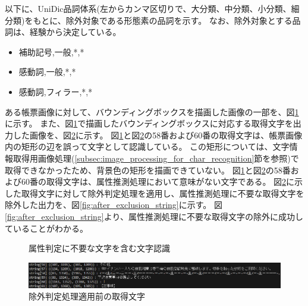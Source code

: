 以下に、UniDic品詞体系(左からカンマ区切りで、大分類、中分類、小分類、細分類)をもとに、除外対象である形態素の品詞を示す。
なお、除外対象とする品詞は、経験から決定している。

\begin{itemize}
    \item 補助記号,一般,*,*
    \item 感動詞,一般,*,*
    \item 感動詞,フィラー,*,*
\end{itemize}

ある帳票画像に対して、バウンディングボックスを描画した画像の一部を、図\ref{fig:before_exclusion_bbox}に示す。
また、図\ref{fig:before_exclusion_bbox}で描画したバウンディングボックスに対応する取得文字を出力した画像を、図\ref{fig:before_exclusion_string}に示す。
図\ref{fig:before_exclusion_bbox}と図\ref{fig:before_exclusion_string}の58番および60番の取得文字は、帳票画像内の矩形の辺を誤って文字として認識している。
この矩形については、文字情報取得用画像処理(\ref{subsec:image_processing_for_char_recognition}節を参照)で取得できなかったため、背景色の矩形を描画できていない。
図\ref{fig:before_exclusion_bbox}と図\ref{fig:before_exclusion_string}の58番および60番の取得文字は、属性推測処理において意味がない文字である。
図\ref{fig:before_exclusion_string}に示した取得文字に対して除外判定処理を適用し、属性推測処理に不要な取得文字を除外した出力を、図\ref{fig:after_exclusion_string}に示す。
図\ref{fig:after_exclusion_string}より、属性推測処理に不要な取得文字の除外に成功していることがわかる。

\begin{figure}[t]
    \begin{center}
        \caption{属性判定に不要な文字を含む文字認識}
        \label{fig:before_exclusion_bbox}
    \end{center}
\end{figure}

\begin{figure}[t]
    \begin{center}
        \includegraphics[width=15cm]{image/04-implementation/before_exclusion_string.png}
        \caption{除外判定処理適用前の取得文字}
        \label{fig:before_exclusion_string}
    \end{center}
\end{figure}

